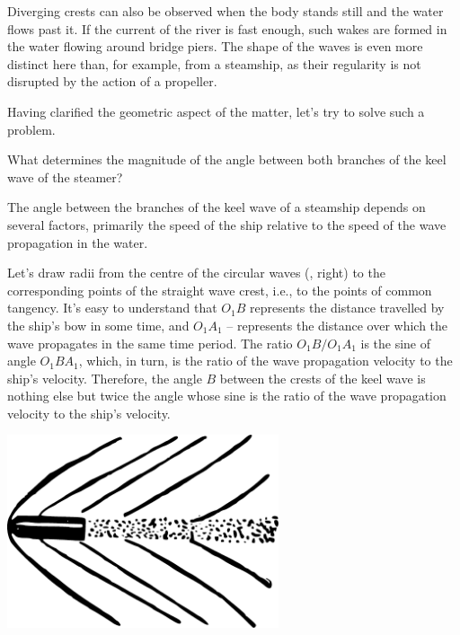 Diverging crests can also be observed when the body stands still and the water flows past it. If the current of the river is fast enough, such wakes are formed in the water flowing around bridge piers. The shape of the waves is even more distinct here than, for example, from a steamship, as their regularity is not disrupted by the action of a propeller.

Having clarified the geometric aspect of the matter, let's try to solve such a problem.

\ques What determines the magnitude of the angle between both branches of the keel wave of the steamer?

\ans The angle between the branches of the keel wave of a steamship depends on several factors, primarily the speed of the ship relative to the speed of the wave propagation in the water.

Let's draw radii from the centre of the circular waves (, right) to the corresponding points of the straight wave crest, i.e., to the points of common tangency. It's easy to understand that $O_{1}B$ represents the distance travelled by the ship's bow in some time, and $O_{1}A_{1}$ -- represents the distance over which the wave propagates in the same time period. The ratio $O_{1}B/O_{1}A_{1}$ is the sine of angle $O_{1}BA_{1}$, which, in turn, is the ratio of the wave propagation velocity to the ship's velocity. Therefore, the angle $B$ between the crests of the keel wave is nothing else but twice the angle whose sine is the ratio of the wave propagation velocity to the ship's velocity.
\begin{marginfigure}[-2cm]%
\centering
\includegraphics[width=0.6\textwidth]{figures/ch-02/fig-050.pdf}
\end{marginfigure}

